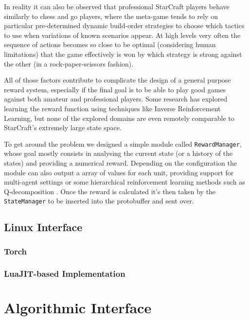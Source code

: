 In reality it can also be observed that professional StarCraft players behave
similarly to chess and go players, where the meta-game tends to rely on
particular pre-determined dynamic build-order strategies to choose which tactics
to use when variations of known scenarios appear. At high levels very often the
sequence of actions becomes so close to be optimal (considering human
limitations) that the game effectively is won by which strategy is strong
against the other (in a rock-paper-scissors fashion).

All of those factors contribute to complicate the design of a general purpose
reward system, especially if the final goal is to be able to play good games
against both amateur and professional players. Some research has explored
learning the reward function using techniques like Inverse Reinforcement
Learning\citep{ng2000algorithms}, but none of the explored domains are even
remotely comparable to StarCraft's extremely large state space.


To get around the problem we designed a simple module called
\texttt{RewardManager}, whose goal mostly consists in analysing the current
state (or a history of the states) and providing a numerical reward. Depending
on the configuration the module can also output a array of values for each unit,
providing support for multi-agent settings or some hierarchical reinforcement
learning methods such as Q-decomposition \citep{russell2003q}. Once the reward
is calculated it's then taken by the \texttt{StateManager} to be inserted into
the protobuffer and sent over.


\subsection{Linux Interface}

\subsubsection{Torch}

\subsubsection{LuaJIT-based Implementation}

\section{Algorithmic Interface}

